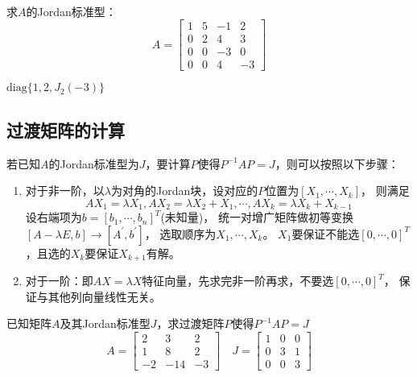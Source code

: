 ~

\begin{exercise}[分块矩阵应用]
  求$A$的Jordan标准型：
  \begin{equation*}
    A = \left[
      \begin{array}{cccc}
        1&5&-1&2\\
        0&2&4&3 \\
         0&0&-3&0 \\
         0&0&4&-3
      \end{array}
    \right]
  \end{equation*}
\end{exercise}

\begin{solution}
  $\text{diag}\{1,2,J_2(-3)\}$
\end{solution}

\subsection{过渡矩阵的计算}

\begin{theorem}[过渡矩阵计算总结]
  若已知$A$的Jordan标准型为$J$，要计算$P$使得$P^{-1}AP = J$，则可以按照以下步骤：
  \begin{enumerate}
  \item 对于非一阶，以$\lambda$为对角的Jordan块，设对应的$P$位置为$[X_1,\cdots,X_k]$，
    则满足
    \begin{equation*}
      AX_1 = \lambda X_1, AX_2 = \lambda X_2 + X_1, \cdots, AX_k = \lambda X_k + X_{k-1}
    \end{equation*}
    设右端项为$b = [b_1,\cdots,b_n]^T$(未知量)，
    统一对增广矩阵做初等变换$[A - \lambda E,b] \rightarrow [A^{\prime}, b^{\prime}]$，
    选取顺序为$X_1,\cdots,X_k$。
    $X_1$要保证不能选$[0,\cdots,0]^T$，且选的$X_k$要保证$X_{k+1}$有解。
  \item 对于一阶：即$AX = \lambda X$特征向量，先求完非一阶再求，不要选$[0,\cdots,0]^T$，
    保证与其他列向量线性无关。
  \end{enumerate}
\end{theorem}



\begin{exercise}
  已知矩阵$A$及其Jordan标准型$J$，求过渡矩阵$P$使得$P^{-1}AP = J$
  \begin{equation*}
    A = \left[
      \begin{array}{ccc}
        2&3&2 \\
         1&8&2 \\
         -2&-14&-3
      \end{array}
    \right] \quad
    J = \left[
      \begin{array}{ccc}
        1&0&0 \\
         0&3&1 \\
         0&0&3
      \end{array}
    \right]
  \end{equation*}
\end{exercise}

